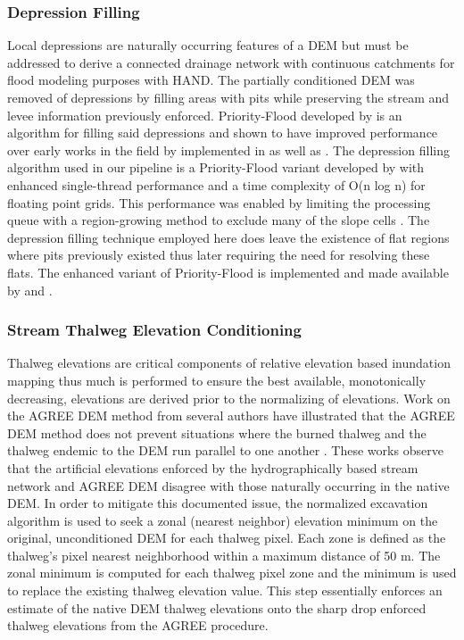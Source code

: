 \subsubsection{Depression Filling}
\label{sssec:depression_filling}
%
Local depressions are naturally occurring features of a DEM but must be addressed to derive a connected drainage network with continuous catchments for flood modeling purposes with HAND.
The partially conditioned DEM was removed of depressions by filling areas with pits while preserving the stream and levee information previously enforced.
Priority-Flood developed by  is an algorithm for filling said depressions and shown to have improved performance over early works in the field by  implemented in  as well as .
The depression filling algorithm used in our pipeline is a Priority-Flood variant developed by \cite{zhou2016efficient} with enhanced single-thread performance and a time complexity of O(n log n) for floating point grids.
This performance was enabled by limiting the processing queue with a region-growing method to exclude many of the slope cells \cite{zhou2016efficient}.
The depression filling technique employed here does leave the existence of flat regions where pits previously existed thus later requiring the need for resolving these flats.
The enhanced variant of Priority-Flood is implemented and made available by  and .
%
\subsubsection{Stream Thalweg Elevation Conditioning}
\label{sssec:stream_thalweg_elevation_conditioning}
%
Thalweg elevations are critical components of relative elevation based inundation mapping thus much is performed to ensure the best available, monotonically decreasing, elevations are derived prior to the normalizing of elevations.
Work on the AGREE DEM method from several authors have illustrated that the AGREE DEM method does not prevent situations where the burned thalweg and the thalweg endemic to the DEM run parallel to one another \cite{hellweger1997agree,baker2006comparison,saunders1999preparation,saunders1996gis,quenzer1998gis,saunders1995grid}.
These works observe that the artificial elevations enforced by the hydrographically based stream network and AGREE DEM disagree with those naturally occurring in the native DEM.
In order to mitigate this documented issue, the normalized excavation algorithm \cite{saunders1999preparation} is used to seek a zonal (nearest neighbor) elevation minimum on the original, unconditioned DEM for each thalweg pixel. 
Each zone is defined as the thalweg's pixel nearest neighborhood within a maximum distance of 50 m.
The zonal minimum is computed for each thalweg pixel zone and the minimum is used to replace the existing thalweg elevation value.
This step essentially enforces an estimate of the native DEM thalweg elevations onto the sharp drop enforced thalweg elevations from the AGREE procedure.

